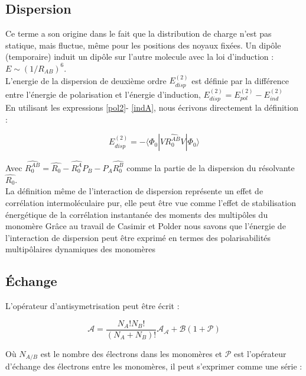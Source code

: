 \subsection{Dispersion}

Ce terme a son origine dans le fait que la distribution de charge n'est pas statique, mais fluctue, même pour les positions des noyaux fixées. Un dipôle (temporaire) induit un dipôle sur l'autre molecule avec la loi d'induction : $E\sim (1/R_{AB})^{6}$.\\

L'energie de la dispersion de deuxième ordre $E_{disp}^{(2)}$ est définie par la différence entre l'énergie de polarisation et l'énergie d'induction, $E_{disp}^{(2)} = E_{pol}^{(2)} - E_{ind}^{(2)}$\\
	
En utilisant les expressions \ref{pol2}- \ref{indA}, nous écrivons directement la définition : 

\begin{equation}
E_{disp}^{(2)} = -\langle \Phi_{0}|V\hat{R_{0}^{AB}}V|\Phi_{0}\rangle
\end{equation}
 
 Avec $\hat{R_{0}^{AB}} = \hat{R_{0}}- \hat{R_{0}^{A}}P_{B} - P_{A}\hat{R_{0}^{B}}$ comme la partie de la dispersion du résolvante $\hat{R_{0}}$.\\
 
 La définition même de l'interaction de dispersion représente un effet de corrélation intermoléculaire pur, elle peut être vue comme l'effet de stabilisation énergétique de la corrélation instantanée des moments des multipôles du monomère Grâce au travail de Casimir et Polder \cite{casimir1948influence} nous savons que l'énergie de l'interaction de dispersion peut être exprimé en termes des polarisabilités multipôlaires dynamiques des monomères 


\subsection{Échange}

L'opérateur d'antisymetrisation peut être écrit : 

\begin{equation}
\mathscr{A} = \frac{N_{A}! N_{B}!}{(N_{A}+ N_{B})!} \mathscr{A_{A}} + \mathscr{B} (1+\mathscr{P})
\end{equation}

Où $N_{A/B}$ est le nombre des électrons dans les monomères et $\mathscr{P}$ est l'opérateur d'échange des électrons entre les monomères, il peut s'exprimer comme une série :

